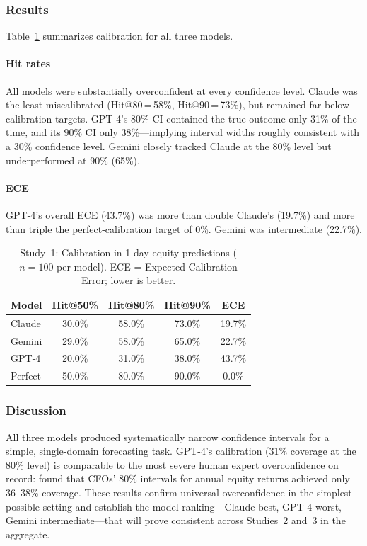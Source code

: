 \subsubsection*{Results}

Table~\ref{tab:study1} summarizes calibration for all three models.

\paragraph{Hit rates} All models were substantially overconfident at every
confidence level. Claude was the least miscalibrated (Hit@80\,=\,58\%,
Hit@90\,=\,73\%), but remained far below calibration targets. GPT-4's 80\%
CI contained the true outcome only 31\% of the time, and its 90\% CI only
38\%---implying interval widths roughly consistent with a 30\% confidence
level. Gemini closely tracked Claude at the 80\% level but underperformed at
90\% (65\%).

\paragraph{ECE} GPT-4's overall ECE (43.7\%) was more than double Claude's
(19.7\%) and more than triple the perfect-calibration target of 0\%.
Gemini was intermediate (22.7\%).

\begin{table}[ht]
  \centering
  \caption{Study~1: Calibration in 1-day equity predictions ($n = 100$ per model).
    ECE = Expected Calibration Error; lower is better.}
  \label{tab:study1}
  \begin{tabular}{lcccc}
    \toprule
    Model   & Hit@50\% & Hit@80\% & Hit@90\% & ECE    \\
    \midrule
    Claude  & 30.0\%   & 58.0\%   & 73.0\%   & 19.7\% \\
    Gemini  & 29.0\%   & 58.0\%   & 65.0\%   & 22.7\% \\
    GPT-4   & 20.0\%   & 31.0\%   & 38.0\%   & 43.7\% \\
    \midrule
    Perfect & 50.0\%   & 80.0\%   & 90.0\%   & 0.0\%  \\
    \bottomrule
  \end{tabular}
\end{table}

\subsubsection*{Discussion}

All three models produced systematically narrow confidence intervals for a
simple, single-domain forecasting task. GPT-4's calibration (31\% coverage at
the 80\% level) is comparable to the most severe human expert overconfidence
on record: \citet{BenDavid2013} found that CFOs' 80\% intervals for annual
equity returns achieved only 36--38\% coverage. These results confirm
universal overconfidence in the simplest possible setting and establish the
model ranking---Claude best, GPT-4 worst, Gemini intermediate---that will
prove consistent across Studies~2 and~3 in the aggregate.
